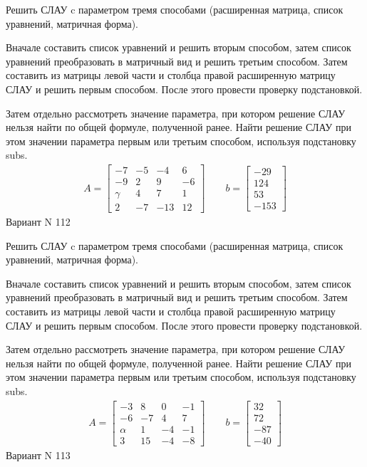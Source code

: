 \documentclass[11pt]{report}
\begin{document}
Решить СЛАУ c параметром тремя способами (расширенная матрица, список уравнений, матричная форма).

Вначале составить список уравнений и решить вторым способом,
затем список уравнений преобразовать в матричный вид и решить третьим способом.
Затем составить из матрицы левой части и столбца правой расширенную матрицу СЛАУ и решить первым способом.
После этого провести проверку подстановкой.

Затем отдельно рассмотреть значение параметра, при котором решение СЛАУ нельзя найти по общей формуле,
полученной ранее.
Найти решение СЛАУ при этом значении параметра первым или третьим способом, используя подстановку subs.
\begin{align*}
    A = \left[\begin{matrix}-7 & -5 & -4 & 6\\-9 & 2 & 9 & -6\\\gamma & 4 & 7 & 1\\2 & -7 & -13 & 12\end{matrix}\right]
\qquad b = \left[\begin{matrix}-29\\124\\53\\-153\end{matrix}\right]
\end{align*}
\newpage
Вариант N 112


Решить СЛАУ c параметром тремя способами (расширенная матрица, список уравнений, матричная форма).

Вначале составить список уравнений и решить вторым способом,
затем список уравнений преобразовать в матричный вид и решить третьим способом.
Затем составить из матрицы левой части и столбца правой расширенную матрицу СЛАУ и решить первым способом.
После этого провести проверку подстановкой.

Затем отдельно рассмотреть значение параметра, при котором решение СЛАУ нельзя найти по общей формуле,
полученной ранее.
Найти решение СЛАУ при этом значении параметра первым или третьим способом, используя подстановку subs.
\begin{align*}
    A = \left[\begin{matrix}-3 & 8 & 0 & -1\\-6 & -7 & 4 & 7\\\alpha & 1 & -4 & -1\\3 & 15 & -4 & -8\end{matrix}\right]
\qquad b = \left[\begin{matrix}32\\72\\-87\\-40\end{matrix}\right]
\end{align*}
\newpage
Вариант N 113
\end{document}
